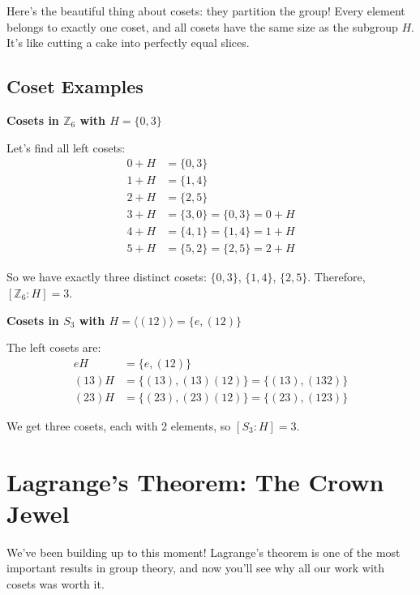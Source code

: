 \documentclass[12pt]{article}
\begin{document}
Here's the beautiful thing about cosets: they partition the group! Every element belongs to exactly one coset, and all cosets have the same size as the subgroup $H$. It's like cutting a cake into perfectly equal slices.

\subsection{\textcolor{HeaderColor}{Coset Examples}}

\begin{examplebox}
\textbf{Cosets in $\mathbb{Z}_6$ with $H = \{0, 3\}$}

Let's find all left cosets:
\begin{align}
0 + H &= \{0, 3\} \\
1 + H &= \{1, 4\} \\  
2 + H &= \{2, 5\} \\
3 + H &= \{3, 0\} = \{0, 3\} = 0 + H \\
4 + H &= \{4, 1\} = \{1, 4\} = 1 + H \\
5 + H &= \{5, 2\} = \{2, 5\} = 2 + H
\end{align}

So we have exactly three distinct cosets: $\{0,3\}$, $\{1,4\}$, $\{2,5\}$.
Therefore, $[\mathbb{Z}_6 : H] = 3$.
\end{examplebox}

\begin{examplebox}
\textbf{Cosets in $S_3$ with $H = \langle (12) \rangle = \{e, (12)\}$}

The left cosets are:
\begin{align}
eH &= \{e, (12)\} \\
(13)H &= \{(13), (13)(12)\} = \{(13), (132)\} \\
(23)H &= \{(23), (23)(12)\} = \{(23), (123)\}
\end{align}

We get three cosets, each with 2 elements, so $[S_3 : H] = 3$.
\end{examplebox}

\section{\textcolor{SectionColor}{Lagrange's Theorem: The Crown Jewel}}

We've been building up to this moment! Lagrange's theorem is one of the most important results in group theory, and now you'll see why all our work with cosets was worth it.
\end{document}
